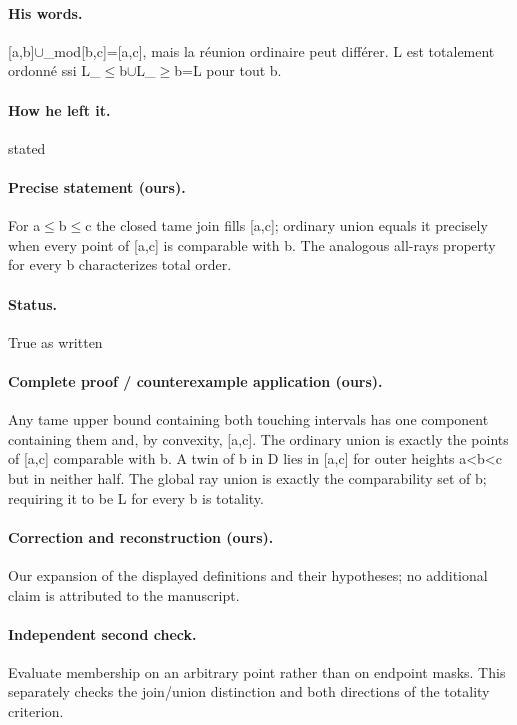 \paragraph{His words.} [a,b]\ensuremath{\cup}\_mod[b,c]=[a,c], mais la réunion ordinaire peut différer. L est totalement ordonné ssi L\_\ensuremath{\leq}b\ensuremath{\cup}L\_\ensuremath{\geq}b=L pour tout b.

\paragraph{How he left it.} stated

\paragraph{Precise statement (ours).} For a\ensuremath{\leq}b\ensuremath{\leq}c the closed tame join fills [a,c]; ordinary union equals it precisely when every point of [a,c] is comparable with b. The analogous all-rays property for every b characterizes total order.

\paragraph{Status.} True as written

\paragraph{Complete proof / counterexample application (ours).} Any tame upper bound containing both touching intervals has one component containing them and, by convexity, [a,c]. The ordinary union is exactly the points of [a,c] comparable with b. A twin of b in D lies in [a,c] for outer heights a<b<c but in neither half. The global ray union is exactly the comparability set of b; requiring it to be L for every b is totality.

\paragraph{Correction and reconstruction (ours).} Our expansion of the displayed definitions and their hypotheses; no additional claim is attributed to the manuscript.

\paragraph{Independent second check.} Evaluate membership on an arbitrary point rather than on endpoint masks. This separately checks the join/union distinction and both directions of the totality criterion.

